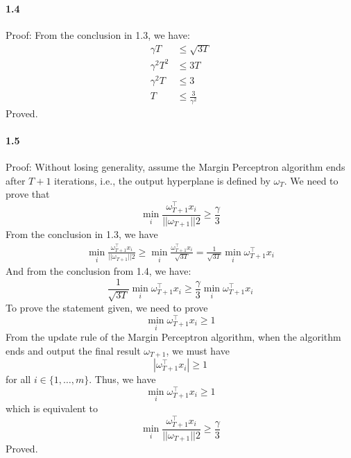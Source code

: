 \documentclass[11pt]{article}
\begin{document}
\paragraph{1.4}
Proof:
\newline
From the conclusion in 1.3, we have:
\begin{equation}
  \begin{split}
    \gamma T &\leq \sqrt{3T}\\
    \gamma^2 T^2 &\leq 3T\\
    \gamma^2 T &\leq 3\\
    T &\leq \frac{3}{\gamma^2}
  \end{split}
\end{equation}
Proved.

\paragraph{1.5}
Proof:
\newline
Without losing generality, assume the Margin Perceptron algorithm ends after $T+1$ iterations, i.e.,
the output hyperplane is defined by $\omega_T$.
We need to prove that
\begin{equation}
  \min_{i} \frac{\omega_{T+1}^\top x_i}{||\omega_{T+1}||2} \geq \frac{\gamma}{3}
\end{equation}
From the conclusion in 1.3, we have
\begin{equation}
  \begin{split}
    \min_{i} \frac{\omega_{T+1}^\top x_i}{||\omega_{T+1}||2} \geq \min_{i} \frac{\omega_{T+1}^\top x_i}{\sqrt{3T}}
    = \frac{1}{\sqrt{3T}} \min_{i} \omega_{T+1}^\top x_i
  \end{split}
\end{equation}
And from the conclusion from 1.4, we have:
\begin{equation}
  \frac{1}{\sqrt{3T}} \min_{i} \omega_{T+1}^\top x_i \geq \frac{\gamma}{3} \min_{i} \omega_{T+1}^\top x_i
\end{equation}
To prove the statement given, we need to prove 
\begin{equation}
  \min_{i} \omega_{T+1}^\top x_i \geq 1
\end{equation}
From the update rule of the Margin Perceptron algorithm, when the algorithm ends and output the final result $\omega_{T+1}$,
we must have
\begin{equation}
  |\omega_{T+1}^\top x_i| \geq 1
\end{equation}
for all $i \in \{1, \ldots, m\}$. Thus, we have
\begin{equation}
  \min_{i} \omega_{T+1}^\top x_i \geq 1
\end{equation}
which is equivalent to
\begin{equation}
  \min_{i} \frac{\omega_{T+1}^\top x_i}{||\omega_{T+1}||2} \geq \frac{\gamma}{3}
\end{equation}
Proved.
\end{document}
